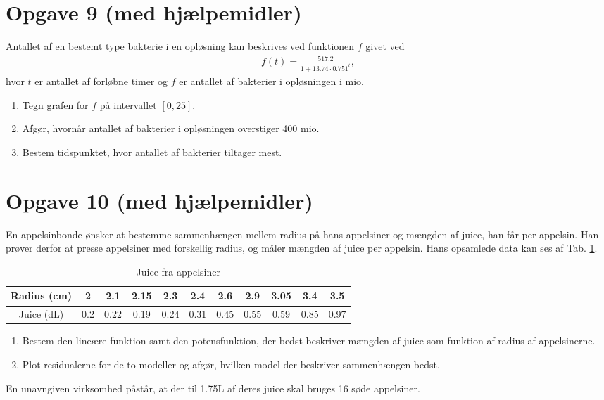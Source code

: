 \documentclass[12pt]{article}
\begin{document}
\section*{Opgave 9 (med hjælpemidler)}

Antallet af en bestemt type bakterie i en opløsning kan beskrives ved funktionen $f$ givet ved
\begin{align*}
f(t) = \frac{517.2}{1+13.74 \cdot 0.751^t},
\end{align*}
hvor $t$ er antallet af forløbne timer og $f$ er antallet af bakterier i opløsningen i mio. 
\begin{enumerate}[label=\roman*)]
\item Tegn grafen for $f$ på intervallet $[0,25]$.
\item Afgør, hvornår antallet af bakterier i opløsningen overstiger 400 mio. 
\item Bestem tidspunktet, hvor antallet af bakterier tiltager mest. 
\end{enumerate}


\section*{Opgave 10 (med hjælpemidler)}
En appelsinbonde ønsker at bestemme sammenhængen mellem radius på hans appelsiner og mængden af juice, han får per appelsin. Han prøver derfor at presse appelsiner med forskellig radius, og måler mængden af juice per appelsin. Hans opsamlede data kan ses af Tab. \ref{tab:juice}.
\begin{table}[H]
\begin{tabular}{c|c|c|c|c|c|c|c|c|c|c}
Radius (cm) & 2 & 2.1 & 2.15 & 2.3 & 2.4 & 2.6 & 2.9 & 3.05 & 3.4 & 3.5\\ \hline
Juice (dL) & 0.2 & 0.22 & 0.19 &0.24 & 0.31 & 0.45 & 0.55 & 0.59 & 0.85 & 0.97
\end{tabular}
\caption{Juice fra appelsiner}
\label{tab:juice}
\end{table}

\begin{enumerate}[label=\roman*)]
\item Bestem den lineære funktion samt den potensfunktion, der bedst beskriver mængden af juice som funktion af radius af appelsinerne. 
\item Plot residualerne for de to modeller og afgør, hvilken model der beskriver sammenhængen bedst.
\end{enumerate}
En unavngiven virksomhed påstår, at der til 1.75L af deres juice skal bruges 16 søde appelsiner. 
\end{document}
